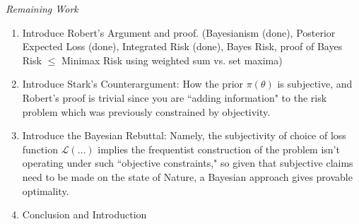 \documentclass[letterpaper,12pt]{article}
\begin{document}
\textit{Remaining Work}
\begin{enumerate}\item{Introduce Robert's Argument and proof. (Bayesianism (done), Posterior Expected Loss (done), Integrated Risk (done), Bayes Risk, proof of Bayes Risk $\leq$ Minimax Risk using weighted sum vs. set maxima)} 
\item{Introduce Stark's Counterargument: How the prior $\pi(\theta)$ is subjective, and Robert's proof is trivial since you are ``adding information" to the risk problem which was previously constrained by objectivity.}
\item{Introduce the Bayesian Rebuttal: Namely, the subjectivity of choice of loss function $\mathcal{L}(\dots)$ implies the frequentist construction of the problem isn't operating under such ``objective constraints," so given that subjective claims need to be made on the state of Nature, a Bayesian approach gives provable optimality. }
\item{Conclusion and Introduction }
 \end{enumerate}

  
\end{document}
